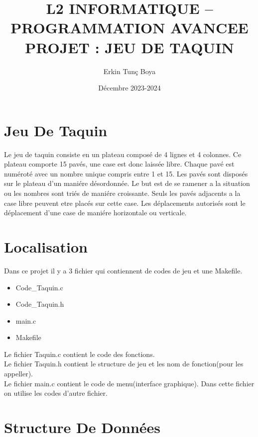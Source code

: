 \documentclass{article}
\title{L2 INFORMATIQUE – PROGRAMMATION AVANCEE \\ PROJET : JEU DE TAQUIN}
\author{Erkin Tunç Boya}
\date{Décembre 2023-2024}
\begin{document}
\maketitle
\tableofcontents
\newpage


\section{Jeu De Taquin}
Le jeu de taquin consiste en un
plateau composé de 4 lignes et 4 colonnes. Ce plateau comporte 15 pavés, une case est donc
laissée libre. Chaque pavé est numéroté avec un nombre unique compris entre 1 et 15.
Les pavés sont disposés sur le plateau d’un maniére désordonnée. Le but est de se ramener a la
situation ou les nombres sont triés de maniére croissante. Seuls les pavés adjacents a la case libre
peuvent etre placés sur cette case. Les déplacements autorisés sont le déplacement d’une case de
maniére horizontale ou verticale.


\section{Localisation}
Dans ce projet il y a 3 fichier qui contiennent de codes de jeu et une Makefile.
\\
\begin{itemize}
	\item Code\_Taquin.c
	\item Code\_Taquin.h
	\item main.c  \\
	\item Makefile \\
\end{itemize}


Le fichier Taquin.c contient le code des fonctions.
\\

Le fichier Taquin.h contient le structure de jeu et les nom de fonction(pour les appeller).\\

Le fichier main.c contient le code de menu(interface graphique). Dans cette fichier on utilise les codes d'autre fichier.


\section{Structure De Données}
\end{document}
